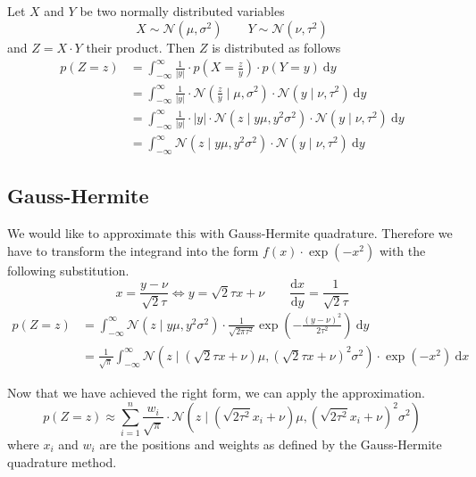 \documentclass[11pt,a4paper]{book}
\begin{document}
Let $X$ and $Y$ be two normally distributed variables
\begin{equation*}
  X \sim \mathcal{N}(\mu, \sigma^{2}) \qquad Y \sim \mathcal{N}(\nu, \tau^{2})
\end{equation*}
and $Z = X \cdot Y$ their product. Then $Z$ is distributed as follows
\begin{align*}
  p(Z = z) & = \int_{-\infty}^{\infty} \frac{1}{|y|} \cdot p\left(X = \frac{z}{y}\right) \cdot p(Y = y)~\mathrm{d}y\\
           & = \int_{-\infty}^{\infty} \frac{1}{|y|} \cdot \mathcal{N}\left( \frac{z}{y} \mid \mu, \sigma^{2} \right) \cdot \mathcal{N}(y \mid \nu, \tau^{2})~\mathrm{d}y\\
           & = \int_{-\infty}^{\infty} \frac{1}{|y|} \cdot |y| \cdot \mathcal{N}\left( z \mid y\mu, y^{2}\sigma^{2} \right) \cdot \mathcal{N}(y \mid \nu, \tau^{2})~\mathrm{d}y\\
           & = \int_{-\infty}^{\infty} \mathcal{N}\left( z \mid y\mu, y^{2}\sigma^{2} \right) \cdot \mathcal{N}(y \mid \nu, \tau^{2})~\mathrm{d}y
\end{align*}

\subsection{Gauss-Hermite}

We would like to approximate this with Gauss-Hermite quadrature. Therefore we
have to transform the integrand into the form $f(x) \cdot \exp(-x^{2})$ with the
following substitution.
\begin{equation*}
  x = \frac{y - \nu}{\sqrt{2}\tau} \Leftrightarrow y = \sqrt{2}\tau x + \nu \qquad \frac{\mathrm{d}x}{\mathrm{d}y} = \frac{1}{\sqrt{2}\tau}
\end{equation*}
\begin{align*}
  p(Z = z) & = \int_{-\infty}^{\infty} \mathcal{N}\left( z \mid y\mu, y^{2}\sigma^{2} \right) \cdot \frac{1}{\sqrt{2\pi\tau^{2}}} \exp\left( -\frac{(y - \nu)^{2}}{2\tau^{2}} \right)~\mathrm{d}y\\
           & = \frac{1}{\sqrt{\pi}} \int_{-\infty}^{\infty} \mathcal{N}\left( z \mid \left(\sqrt{2}\tau x + \nu\right)\mu, \left(\sqrt{2}\tau x + \nu\right)^{2}\sigma^{2} \right) \cdot \exp\left( -x^{2} \right)~\mathrm{d}x
\end{align*}

Now that we have achieved the right form, we can apply the approximation.
\begin{equation*}
  p(Z = z) \approx \sum_{i = 1}^{n} \frac{w_{i}}{\sqrt{\pi}} \cdot \mathcal{N}\left( z \mid \left(\sqrt{2 \tau^{2}} x_{i} + \nu\right)\mu, \left(\sqrt{2 \tau^{2}} x_{i} + \nu\right)^{2}\sigma^{2} \right)
\end{equation*}
where $x_{i}$ and $w_{i}$ are the positions and weights as defined by the
Gauss-Hermite quadrature method.
\end{document}

